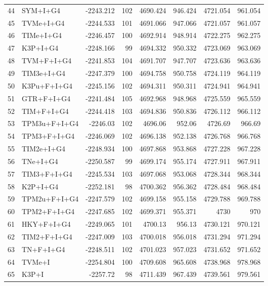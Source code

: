 \begin{longtable}{clrrrrrr}
	44 & SYM+I+G4 & -2243.212 & 102 & 4690.424 & 946.424 & 4721.054 & 961.054 \\ 
	45 & TVMe+I+G4 & -2244.533 & 101 & 4691.066 & 947.066 & 4721.057 & 961.057 \\ 
	46 & TIMe+I+G4 & -2246.457 & 100 & 4692.914 & 948.914 & 4722.275 & 962.275 \\ 
	47 & K3P+I+G4 & -2248.166 & 99 & 4694.332 & 950.332 & 4723.069 & 963.069 \\ 
	48 & TVM+F+I+G4 & -2241.853 & 104 & 4691.707 & 947.707 & 4723.636 & 963.636 \\ 
	49 & TIM3e+I+G4 & -2247.379 & 100 & 4694.758 & 950.758 & 4724.119 & 964.119 \\ 
	50 & K3Pu+F+I+G4 & -2245.156 & 102 & 4694.311 & 950.311 & 4724.941 & 964.941 \\ 
	51 & GTR+F+I+G4 & -2241.484 & 105 & 4692.968 & 948.968 & 4725.559 & 965.559 \\ 
	52 & TIM+F+I+G4 & -2244.418 & 103 & 4694.836 & 950.836 & 4726.112 & 966.112 \\ 
	53 & TPM3u+F+I+G4 & -2246.03 & 102 & 4696.06 & 952.06 & 4726.69 & 966.69 \\ 
	54 & TPM3+F+I+G4 & -2246.069 & 102 & 4696.138 & 952.138 & 4726.768 & 966.768 \\ 
	55 & TIM2e+I+G4 & -2248.934 & 100 & 4697.868 & 953.868 & 4727.228 & 967.228 \\ 
	56 & TNe+I+G4 & -2250.587 & 99 & 4699.174 & 955.174 & 4727.911 & 967.911 \\ 
	57 & TIM3+F+I+G4 & -2245.534 & 103 & 4697.068 & 953.068 & 4728.344 & 968.344 \\ 
	58 & K2P+I+G4 & -2252.181 & 98 & 4700.362 & 956.362 & 4728.484 & 968.484 \\ 
	59 & TPM2u+F+I+G4 & -2247.579 & 102 & 4699.158 & 955.158 & 4729.788 & 969.788 \\ 
	60 & TPM2+F+I+G4 & -2247.685 & 102 & 4699.371 & 955.371 & 4730 & 970 \\ 
	61 & HKY+F+I+G4 & -2249.065 & 101 & 4700.13 & 956.13 & 4730.121 & 970.121 \\ 
	62 & TIM2+F+I+G4 & -2247.009 & 103 & 4700.018 & 956.018 & 4731.294 & 971.294 \\ 
	63 & TN+F+I+G4 & -2248.511 & 102 & 4701.023 & 957.023 & 4731.652 & 971.652 \\ 
	64 & TVMe+I & -2254.804 & 100 & 4709.608 & 965.608 & 4738.968 & 978.968 \\ 
	65 & K3P+I & -2257.72 & 98 & 4711.439 & 967.439 & 4739.561 & 979.561 \\ 

\end{longtable}
